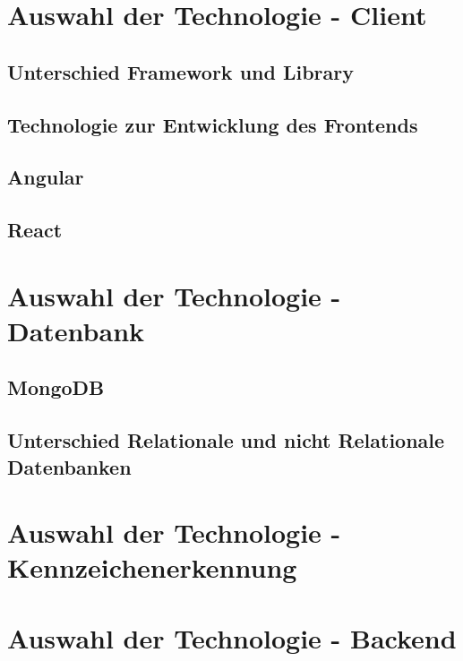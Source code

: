 \section{Auswahl der Technologie - Client}
\lipsum[5-12]

\subsection{Unterschied Framework und Library}
\subsection{Technologie zur Entwicklung des Frontends}
\subsection{Angular}
\subsection{React}

\section{Auswahl der Technologie - Datenbank}
\lipsum[12-18]

\subsection{MongoDB}
\subsection{Unterschied Relationale und nicht Relationale Datenbanken}


\section{Auswahl der Technologie - Kennzeichenerkennung}
\lipsum[5-12]

\section{Auswahl der Technologie - Backend}
\lipsum[5-12]
